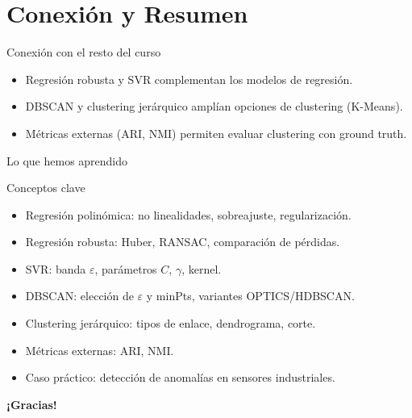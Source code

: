 \documentclass[aspectratio=169, 10pt, xcolor=table]{beamer}
\begin{document}
\section{Conexión y Resumen}

\begin{frame}{Conexión con el resto del curso}
    \begin{itemize}
        \item Regresión robusta y SVR complementan los modelos de regresión.
        \item DBSCAN y clustering jerárquico amplían opciones de clustering (K-Means).
        \item Métricas externas (ARI, NMI) permiten evaluar clustering con ground truth.
    \end{itemize}
\end{frame}

\begin{frame}{Lo que hemos aprendido}
    \begin{exampleblock}{Conceptos clave}
        \begin{itemize}
            \item Regresión polinómica: no linealidades, sobreajuste, regularización.
            \item Regresión robusta: Huber, RANSAC, comparación de pérdidas.
            \item SVR: banda $\varepsilon$, parámetros $C$, $\gamma$, kernel.
            \item DBSCAN: elección de $\varepsilon$ y minPts, variantes OPTICS/HDBSCAN.
            \item Clustering jerárquico: tipos de enlace, dendrograma, corte.
            \item Métricas externas: ARI, NMI.
            \item Caso práctico: detección de anomalías en sensores industriales.
        \end{itemize}
    \end{exampleblock}
\end{frame}

\begin{frame}
    \centering
    \Huge \textbf{¡Gracias!}

\end{frame}
\end{document}
